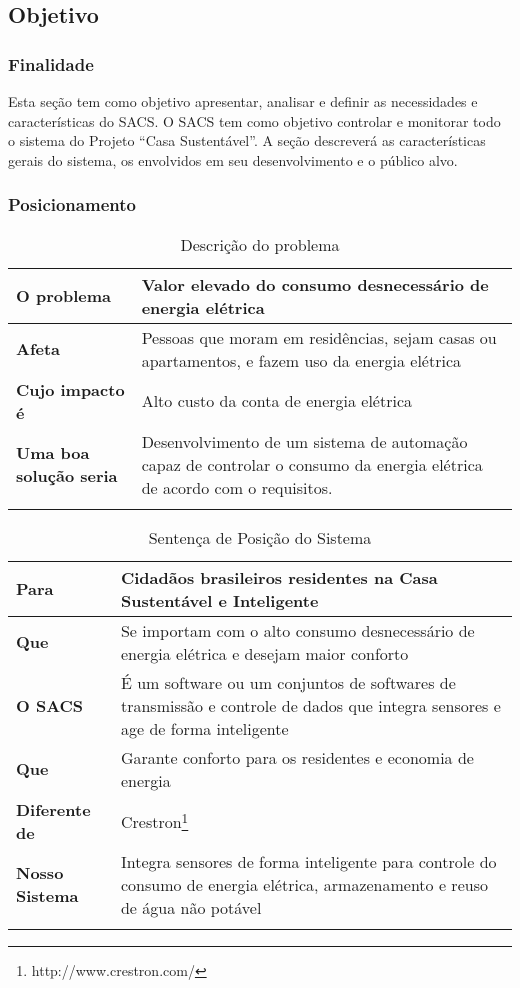 \subsection{Objetivo}
\label{subsec:objetivo}

\subsubsection{Finalidade}

	Esta seção tem como objetivo apresentar, analisar e definir as necessidades e características do SACS. O
	SACS tem como objetivo controlar e monitorar todo o sistema do Projeto “Casa Sustentável”. A seção
	descreverá as características gerais do sistema, os envolvidos em seu desenvolvimento e o público alvo.

\subsubsection{Posicionamento}

\begin{longtable}{|l|m{7cm}|}
	\hline \textbf{O problema} & Valor elevado do consumo desnecessário de energia elétrica\\
	\hline \textbf{Afeta} & Pessoas que moram em residências, sejam casas ou apartamentos, e fazem uso da energia
	elétrica\\
	\hline \textbf{Cujo impacto é} & Alto custo da conta de energia elétrica\\
	\hline \textbf{Uma boa solução seria} & Desenvolvimento de um sistema de automação capaz de controlar o consumo
	da energia elétrica de acordo com o requisitos.\\
	\hline
\caption{Descrição do problema}
\label{Descrição_do_problema}
\end{longtable}


\begin{longtable}{|l|m{7cm}|}
	\hline \textbf{Para} & Cidadãos brasileiros residentes na Casa Sustentável e Inteligente \\
	\hline \textbf{Que} & Se importam com o alto consumo desnecessário de energia elétrica e desejam maior conforto\\
	\hline \textbf{O SACS} & É um software ou um conjuntos de softwares de transmissão e controle de dados que
	integra sensores e age de forma inteligente\\
	\hline \textbf{Que} & Garante conforto para os residentes e economia de energia\\
	\hline \textbf{Diferente de} & Crestron\footnote{http://www.crestron.com/}\\
	\hline \textbf{Nosso Sistema} & Integra sensores de forma inteligente para controle do consumo de energia elétrica,
	armazenamento e reuso de água não potável\\
	\hline
\caption{Sentença de Posição do Sistema}
\label{Sentenca_de_Posicao_do_Sistema}
\end{longtable}

